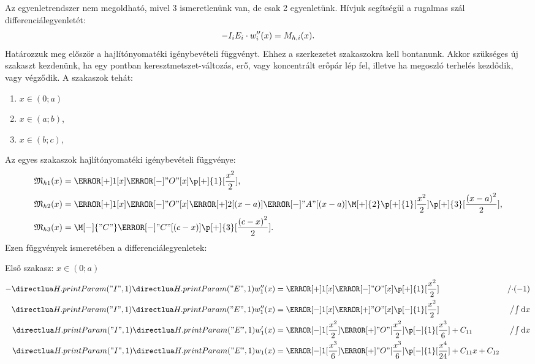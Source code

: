 Az egyenletrendszer nem megoldható, mivel 3 ismeretlenünk van, de csak 2
egyenletünk. Hívjuk segítségül a rugalmas szál differenciálegyenletét:
\begin{equation}
  -I_i E_i \cdot w_i''(x) = M_{h,i}(x)
  \text.
  \label{eq:diffeq-base}
\end{equation}
Határozzuk meg először a hajlítónyomatéki igénybevételi függvényt. Ehhez
a szerkezetet szakaszokra kell bontanunk. Akkor szükséges új szakaszt
kezdenünk, ha egy pontban keresztmetszet-változás, erő, vagy koncentrált erőpár
lép fel, illetve ha megoszló terhelés kezdődik, vagy végződik. A szakaszok
tehát:
\begin{multicols}{3}
  \begin{enumerate}
    \item $x \in (0; a)$
    \item $x \in (a; b)$,
    \item $x \in (b; c)$,
  \end{enumerate}
\end{multicols}
Az egyes szakaszok hajlítónyomatéki igénybevételi függvénye:
\begin{align}
  \spec M_{h1}(x) & =
  \F[+]{1}[x]
  \F[-]{"O"}[x]
  \p[+]{1}[\frac{x^2}{2}]
  \text,
  \\
  \spec M_{h2}(x) & =
  \F[+]{1}[x]
  \F[-]{"O"}[x]
  \F[+]{2}[(x - a)]
  \F[-]{"A"}[(x - a)]
  \M[+]{2}
  \p[+]{1}[\frac{x^2}{2}]
  \p[+]{3}[\frac{\left( x - a \right)^2 }{2}]
  \text,
  \\
  \spec M_{h3}(x) & =
  \M[-]{"C"}
  \F[-]{"C"}[(c - x)]
  \p[+]{3}[\frac{\left( c - x \right)^2}{2}]
  \text.
\end{align}
Ezen függvények ismeretében a differenciálegyenletek:
\newcommand{\op}[1]{&{\textstyle \left/ #1 \right.}}
\newcommand{\opint}{\op{\int \mathrm d x}}


Első szakasz: $x \in (0;a)$
\begin{align}
  - \I{1} \E{1} w_1''(x) & =
  \F[+]{1}[x]
  \F[-]{"O"}[x]
  \p[+]{1}[\frac{x^2}{2}]
  \op{\cdot(-1)}
  \\
  \I{1} \E{1} w_1''(x)   & =
  \F[-]{1}[x]
  \F[+]{"O"}[x]
  \p[-]{1}[\frac{x^2}{2}]
  \opint{}
  \\
  \I{1} \E{1} w_1'(x)    & =
  \F[-]{1}[\frac{x^2}{2}]
  \F[+]{"O"}[\frac{x^2}{2}]
  \p[-]{1}[\frac{x^3}{6}]
  + C_{11}
  \opint{}
  \\
  \I{1} \E{1} w_1(x)     & =
  \F[-]{1}[\frac{x^3}{6}]
  \F[+]{"O"}[\frac{x^3}{6}]
  \p[-]{1}[\frac{x^4}{24}]
  + C_{11} x
  + C_{12}
\end{align}


